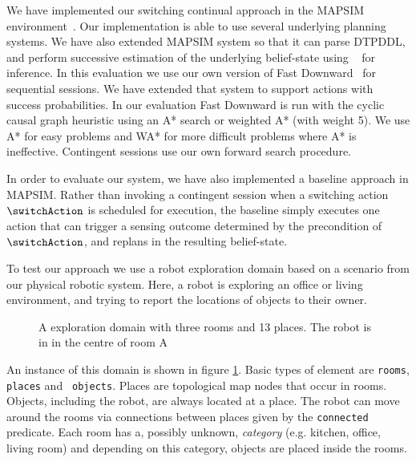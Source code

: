 
We have implemented our switching continual approach in the MAPSIM
environment~\cite{brenner:nebel:jaamas09}. Our implementation is able
to use several underlying planning systems. We have also extended
MAPSIM system so that it can parse DTPDDL, and perform successive
estimation of the underlying belief-state using
~\cite{king:2009} for inference.  In this evaluation
we use our own version of Fast Downward~\cite{fast-downward} for
sequential sessions. We have extended that system to support actions
with success probabilities. In our evaluation Fast Downward is run
with the cyclic causal graph heuristic using an A* search or weighted
A* (with weight 5). We use A* for easy problems and WA* for more
difficult problems where A* is ineffective. Contingent sessions use
our own forward search procedure.



In order to evaluate our system, we have also implemented a baseline
approach in MAPSIM. Rather than invoking a contingent session when a
switching action $\switchAction$ is scheduled for execution, the
baseline simply executes one action that can trigger a sensing outcome
determined by the precondition of $\switchAction$, and replans in the
resulting belief-state.






To test our approach we use a robot exploration domain based on a
scenario from our physical robotic system. Here, a robot is
exploring an office or living environment, and trying to report the
locations of objects to their owner.

\begin{figure}[h]
  \centering
  
  \caption{A exploration domain with three rooms and 13 places. The
    robot is in in the centre of room A}
\label{fig:dora2}
\end{figure}
An instance of this domain is shown in figure \ref{fig:dora2}. Basic
types of element are {\tt rooms}, {\tt places} and {\tt
  objects}. Places are topological map nodes that occur in rooms.
Objects, including the robot, are always located at a place. The robot
can move around the rooms via connections between places given by the
{\tt connected} predicate. Each room has a, possibly unknown, {\em
  category} (e.g. kitchen, office, living room) and depending on this
category, objects are placed inside the rooms.

